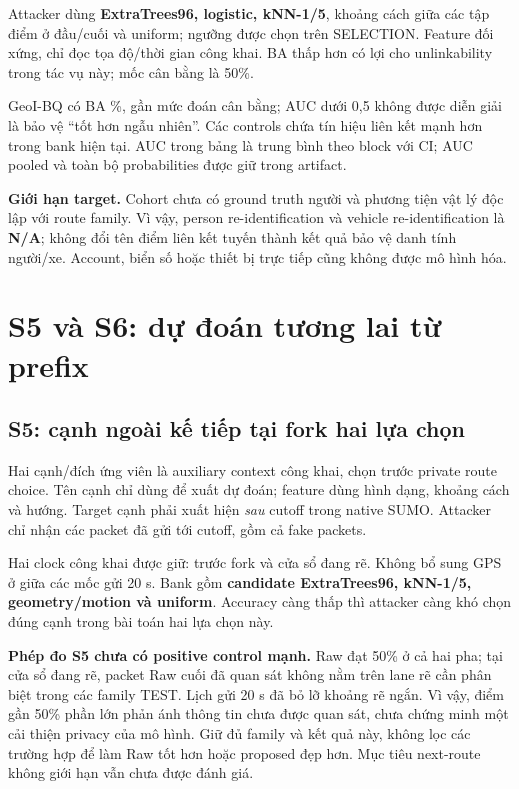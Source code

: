 \documentclass[10pt,a4paper]{article}
\begin{document}
Attacker dùng \textbf{ExtraTrees96, logistic, kNN-1/5}, khoảng cách giữa các tập điểm ở đầu/cuối và uniform;
ngưỡng được chọn trên SELECTION. Feature đối xứng, chỉ đọc tọa độ/thời gian công khai. BA thấp hơn có lợi
cho unlinkability trong tác vụ này; mốc cân bằng là 50\%.
\begin{small}\end{small}

GeoI-BQ có BA \PrimaryBA\%, gần mức đoán cân bằng; AUC dưới 0,5 không được diễn giải là bảo vệ
``tốt hơn ngẫu nhiên''. Các controls chứa tín hiệu liên kết mạnh hơn trong bank hiện tại.
AUC trong bảng là trung bình theo block với CI; AUC pooled và toàn bộ probabilities được giữ trong artifact.

\textbf{Giới hạn target.} Cohort chưa có ground truth người và phương tiện vật lý độc lập với route family.
Vì vậy, person re-identification và vehicle re-identification là \textbf{N/A}; không đổi tên điểm liên kết tuyến
thành kết quả bảo vệ danh tính người/xe. Account, biển số hoặc thiết bị trực tiếp cũng không được mô hình hóa.

\clearpage
\section{S5 và S6: dự đoán tương lai từ prefix}
\subsection{S5: cạnh ngoài kế tiếp tại fork hai lựa chọn}
Hai cạnh/đích ứng viên là auxiliary context công khai, chọn trước private route choice. Tên cạnh chỉ dùng
để xuất dự đoán; feature dùng hình dạng, khoảng cách và hướng. Target cạnh phải xuất hiện \emph{sau} cutoff
trong native SUMO. Attacker chỉ nhận các packet đã gửi tới cutoff, gồm cả fake packets.

Hai clock công khai được giữ: trước fork và cửa sổ đang rẽ. Không bổ sung GPS ở giữa các mốc gửi 20 s.
Bank gồm \textbf{candidate ExtraTrees96, kNN-1/5, geometry/motion và uniform}. Accuracy càng thấp thì
attacker càng khó chọn đúng cạnh trong bài toán hai lựa chọn này.
\begin{small}\end{small}

\textbf{Phép đo S5 chưa có positive control mạnh.} Raw đạt 50\% ở cả hai pha; tại cửa sổ đang rẽ,
packet Raw cuối đã quan sát không nằm trên lane rẽ cần phân biệt trong các family TEST.
Lịch gửi 20 s đã bỏ lỡ khoảng rẽ ngắn. Vì vậy, điểm gần 50\% phần lớn phản ánh thông tin chưa được quan sát,
chưa chứng minh một cải thiện privacy của mô hình. Giữ đủ family và kết quả này, không lọc các trường hợp
để làm Raw tốt hơn hoặc proposed đẹp hơn. Mục tiêu next-route không giới hạn vẫn chưa được đánh giá.
\end{document}
